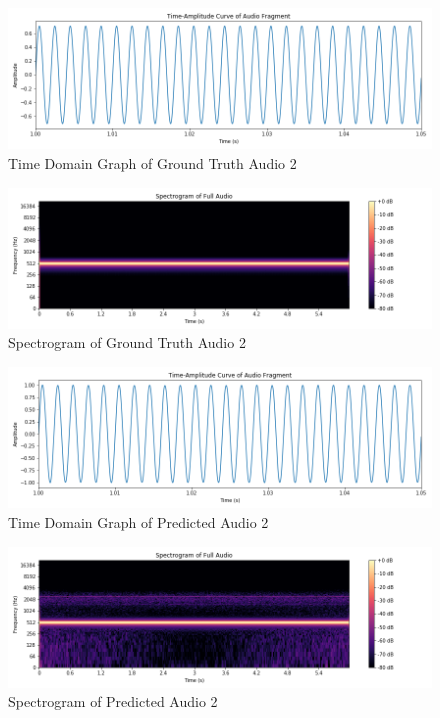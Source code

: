 \documentclass{ioereport}
\begin{document}
    \begin{figure}[H]
        \centering
        \includegraphics[width=\linewidth]{assets/audio_results/puretone500hztime.png}
        \caption{Time Domain Graph of Ground Truth Audio 2}
        \label{fig:gt-pure500-time}
    \end{figure}
    \begin{figure}[H]
        \centering
        \includegraphics[width=\linewidth]{assets/audio_results/puretone500hzspec.png}
        \caption{Spectrogram of Ground Truth Audio 2}
        \label{fig:gt-pure500-spec}
    \end{figure}
    
    \begin{figure}[H]
        \centering
        \includegraphics[width=\linewidth]{assets/audio_results/predpuretone500hztime.png}
        \caption{Time Domain Graph of Predicted Audio 2}
        \label{fig:pred-pure500-time}
    \end{figure}
    \begin{figure}[H]
        \centering
        \includegraphics[width=\linewidth]{assets/audio_results/predpuretone500hzspec.png}
        \caption{Spectrogram of Predicted Audio 2}
        \label{fig:pred-pure500-spec}
    \end{figure}
\end{document}
